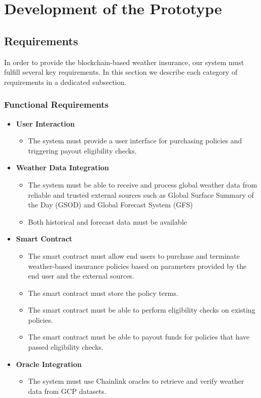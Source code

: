 \chapter{Development of the Prototype}\label{chapter:development_prototype}
\section{Requirements}\label{section:requirements}

In order to provide the blockchain-based weather insurance, our system must fulfill several key requirements. In this section we describe each category of requirements in a dedicated subsection.

\subsection{Functional Requirements}\label{subsection:functionalRequirements}

\begin{itemize}
    \item \textbf{User Interaction}
    \begin{itemize}
        \item The system must provide a user interface for purchasing policies and triggering payout eligibility checks. 
    \end{itemize}

    \item \textbf{Weather Data Integration} 
    \begin{itemize}
        \item The system must be able to receive and process global weather data from reliable and trusted external sources such as Global Surface Summary of the Day (GSOD) and Global Forecast System (GFS)
        \item Both historical and forecast data must be available
    \end{itemize}
    
    \item \textbf{Smart Contract}
    \begin{itemize}
        \item The smart contract must allow end users to purchase and terminate weather-based insurance policies based on parameters provided by the end user and the external sources.
        \item The smart contract must store the policy terms.
        \item The smart contract must be able to perform eligibility checks on existing policies.
        \item The smart contract must be able to payout funds for policies that have passed eligibility checks.
    \end{itemize}
    
    \item \textbf{Oracle Integration}
    \begin{itemize}
        \item The system must use Chainlink oracles to retrieve and verify weather data from GCP datasets.
    \end{itemize}
\end{itemize}

